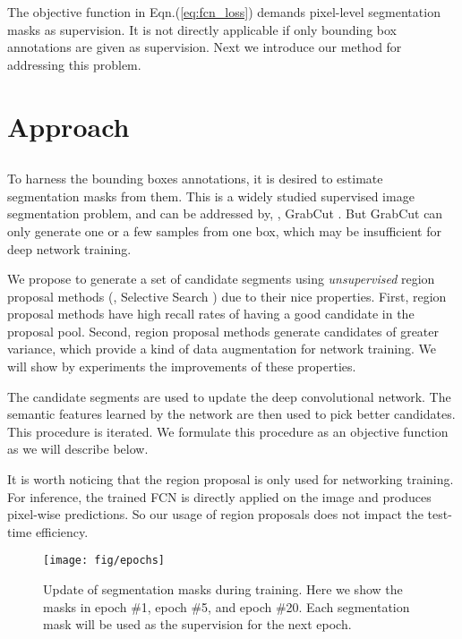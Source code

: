 \documentclass[10pt,twocolumn,letterpaper]{article}
\begin{document}
The objective function in Eqn.(\ref{eq:fcn_loss}) demands pixel-level segmentation masks  as supervision. It is not directly applicable if only bounding box annotations are given as supervision. Next we introduce our method for addressing this problem.

\section{Approach}

\subsection{\fontsize{9.9pt}{1em}}

To harness the bounding boxes annotations, it is desired to estimate segmentation masks from them. This is a widely studied supervised image segmentation problem, and can be addressed by, \eg, GrabCut \cite{rother2004grabcut}. But GrabCut can only generate one or a few samples from one box, which may be insufficient for deep network training.

We propose to generate a set of candidate segments using \emph{unsupervised} region proposal methods (\eg, Selective Search \cite{uijlings2013selective}) due to their nice properties. First, region proposal methods have high recall rates \cite{arbelaez2014multiscale} of having a good candidate in the proposal pool. Second, region proposal methods generate candidates of greater variance, which provide a kind of data augmentation \cite{krizhevsky2012imagenet} for network training. We will show by experiments the improvements of these properties.

The candidate segments are used to update the deep convolutional network. The semantic features learned by the network are then used to pick better candidates. This procedure is iterated.
We formulate this procedure as an objective function as we will describe below.

It is worth noticing that the region proposal is only used for networking training. For inference, the trained FCN is directly applied on the image and produces pixel-wise predictions. So our usage of region proposals does not impact the test-time efficiency.

\begin{figure*}[t]
	\centering
	\texttt{[image: fig/epochs]}
	\caption{Update of segmentation masks during training. Here we show the masks in epoch \#1, epoch \#5, and epoch \#20. Each segmentation mask will be used as the supervision for the next epoch.}
	\label{fig:epochs}
\end{figure*}
\end{document}
